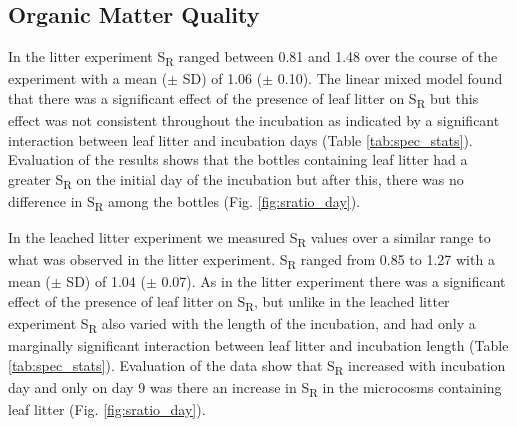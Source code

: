 \subsection{Organic Matter Quality}

In the litter experiment S\textsubscript{R} ranged between 0.81 and 1.48 over the course of the experiment with a mean ($\pm$ SD) of 1.06 ($\pm$ 0.10).  The linear mixed model found that there was a significant effect of the presence of leaf litter on S\textsubscript{R} but this effect was not consistent throughout the incubation as indicated by a significant interaction between leaf litter and incubation days (Table \ref{tab:spec_stats}). Evaluation of the results shows that the bottles containing leaf litter had a greater S\textsubscript{R} on the initial day of the incubation but after this, there was no difference in S\textsubscript{R} among the bottles (Fig. \ref{fig:sratio_day}).

In the leached litter experiment  we measured S\textsubscript{R} values over a similar range to what was observed in the litter experiment. S\textsubscript{R} ranged from 0.85 to 1.27 with a mean ($\pm$ SD) of 1.04 ($\pm$ 0.07).  As in the litter experiment there was a significant effect of the presence of leaf litter on S\textsubscript{R}, but unlike in the leached litter experiment S\textsubscript{R} also varied with the length of the incubation, and had only a marginally significant interaction between leaf litter and incubation length (Table \ref{tab:spec_stats}). Evaluation of the data show that S\textsubscript{R} increased with incubation day and only on day 9 was there an increase in S\textsubscript{R} in the microcosms containing leaf litter (Fig. \ref{fig:sratio_day}).